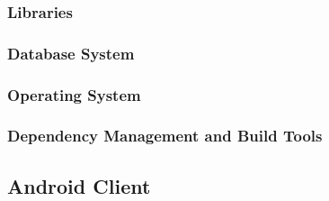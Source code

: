 \documentclass[a4paper,10pt]{article}
\begin{document}
\subsubsection{Libraries}
\subsubsection{Database System}
\subsubsection{Operating System}
\subsubsection{Dependency Management and Build Tools}

\subsection{Android Client}
\end{document}
